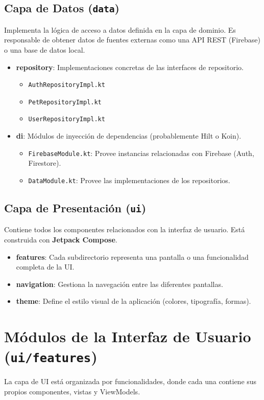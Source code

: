 \documentclass[12pt, a4paper]{article}
\begin{document}
\subsection{Capa de Datos (\texttt{data})}
Implementa la lógica de acceso a datos definida en la capa de dominio. Es responsable de obtener datos de fuentes externas como una API REST (Firebase) o una base de datos local.
\begin{itemize}
    \item \textbf{repository}: Implementaciones concretas de las interfaces de repositorio.
    \begin{itemize}
        \item \texttt{AuthRepositoryImpl.kt}
        \item \texttt{PetRepositoryImpl.kt}
        \item \texttt{UserRepositoryImpl.kt}
    \end{itemize}
    \item \textbf{di}: Módulos de inyección de dependencias (probablemente Hilt o Koin).
    \begin{itemize}
        \item \texttt{FirebaseModule.kt}: Provee instancias relacionadas con Firebase (Auth, Firestore).
        \item \texttt{DataModule.kt}: Provee las implementaciones de los repositorios.
    \end{itemize}
\end{itemize}

\subsection{Capa de Presentación (\texttt{ui})}
Contiene todos los componentes relacionados con la interfaz de usuario. Está construida con \textbf{Jetpack Compose}.
\begin{itemize}
    \item \textbf{features}: Cada subdirectorio representa una pantalla o una funcionalidad completa de la UI.
    \item \textbf{navigation}: Gestiona la navegación entre las diferentes pantallas.
    \item \textbf{theme}: Define el estilo visual de la aplicación (colores, tipografía, formas).
\end{itemize}

\newpage

\section{Módulos de la Interfaz de Usuario (\texttt{ui/features})}
La capa de UI está organizada por funcionalidades, donde cada una contiene sus propios componentes, vistas y ViewModels.
\end{document}
